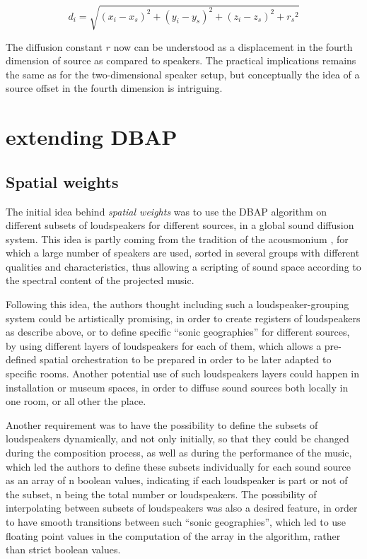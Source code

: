 \documentclass[twoside,10pt]{article}
\begin{document}
\begin{equation} \label{eq:3D_mod_distance}
d_{i} = \sqrt{ {(x_{i} - x_{s})}^2 + {(y_{i} - y_{s})}^2 + {(z_{i} - z_{s})}^2 + {r_{s}}^2}
\end{equation}

The diffusion constant $r$ now can be understood as a displacement in the fourth dimension of source as compared to speakers. The practical implications remains the same as for the two-dimensional speaker setup, but conceptually the idea of a source offset in the fourth dimension is intriguing.




\section{extending DBAP}

\subsection{Spatial weights}

The initial idea behind \textit{spatial weights} was to use the DBAP algorithm on different subsets of loudspeakers for different sources, in a global sound diffusion system. This idea is partly coming from the tradition of the acousmonium \cite{Bayle:1993MusiqueAcousmatique}, for which a large number of speakers are used, sorted in several groups with different qualities and characteristics, thus allowing a scripting of sound space according to the spectral content of the projected music\cite{Prager:2002acousmatique}.

Following this idea, the authors thought including such a loudspeaker-grouping system could be artistically promising, in order to create registers of loudspeakers as describe above, or to define specific ``sonic geographies'' for different sources, by using different layers of loudspeakers for each of them, which allows a pre-defined spatial orchestration to be prepared in order to be later adapted to specific rooms\cite{Lyon:2008spatial_orchestration}. Another potential use of such loudspeakers layers could happen in installation or museum spaces, in order to diffuse sound sources both locally in one room, or all other the place.

Another requirement was to have the possibility to define the subsets of loudspeakers dynamically, and not only initially, so that they could be changed during the composition process, as well as during the performance of the music, which led the authors to define these subsets individually for each sound source as an array of n boolean values, indicating if each loudspeaker is part or not of the subset, n being the total number or loudspeakers.
The possibility of interpolating between subsets of loudspeakers was also a desired feature, in order to have smooth transitions between such ``sonic geographies'', which led to use floating point values in the computation of the array in the algorithm, rather than strict boolean values. 
\end{document}
